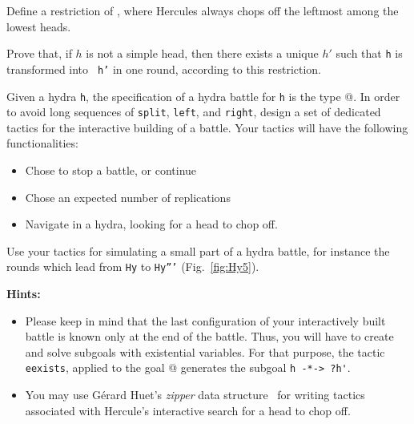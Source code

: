 
\begin{exercise}
Define a restriction of ,  where Hercules always chops off
the leftmost among the lowest heads.

Prove that, if $h$ is not a simple head, then there exists a unique $h'$ such that \texttt{h}  is transformed into \texttt{ h'} in one round, according to this restriction.


\end{exercise}


\begin{exercise}
\label{exo:interactive-battle}
Given a hydra \texttt{h}, the specification of a hydra battle for \texttt{h} is the type 
@. In order to avoid long sequences of \texttt{split}, \texttt{left}, and 
\texttt{right}, design a set of dedicated tactics for the interactive building of a battle.
Your tactics will have the following functionalities:
\begin{itemize}
\item  Chose to stop a battle, or continue
\item Chose an expected number of replications
\item Navigate in a hydra, looking for a head to chop off.
\end{itemize}

Use your tactics for simulating a small part of a hydra battle, for instance the rounds which lead from
\texttt{Hy} to \texttt{Hy'''}  (Fig.~\vref{fig:Hy5}).

\textbf{Hints:} 
\begin{itemize}

\item Please keep in mind that the last  configuration of your interactively built battle is known only at the end of the battle. Thus, you will have to create and solve subgoals with existential variables. For that purpose, the tactic \texttt{eexists}, applied to the 
goal @ generates the subgoal \Verb|h -*-> ?h'|.
\item You may use Gérard Huet's \emph{zipper} data structure~\cite{zipper} for writing tactics associated with Hercule's  interactive search for a head to chop off.
\end{itemize}






\end{exercise}




